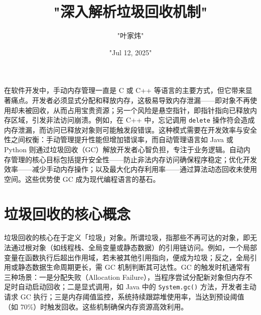 \title{"深入解析垃圾回收机制"}
\author{"叶家炜"}
\date{"Jul 12, 2025"}
\maketitle
在软件开发中，手动内存管理一直是 C 或 C++ 等语言的主要方式，但它带来显著痛点。开发者必须显式分配和释放内存，这极易导致内存泄漏——即对象不再使用却未被回收，从而占用宝贵资源；另一个风险是悬空指针，即指针指向已释放内存区域，引发非法访问崩溃。例如，在 C++ 中，忘记调用 \texttt{delete} 操作符会造成内存泄漏，而访问已释放对象则可能触发段错误。这种模式需要在开发效率与安全性之间权衡：手动管理提升性能但增加错误率，而自动管理语言如 Java 或 Python 则通过垃圾回收（GC）解放开发者心智负担，专注于业务逻辑。自动内存管理的核心目标包括提升安全性——防止非法内存访问确保程序稳定；优化开发效率——减少手动内存操作；以及最大化内存利用率——通过算法动态回收未使用空间。这些优势使 GC 成为现代编程语言的基石。\par
\chapter{垃圾回收的核心概念}
垃圾回收的核心在于定义「垃圾」对象。所谓垃圾，指那些不再可达的对象，即无法通过根对象（如线程栈、全局变量或静态数据）的引用链访问。例如，一个局部变量在函数执行后超出作用域，若未被其他引用指向，便成为垃圾；反之，全局引用或静态数据生命周期更长，需 GC 机制判断其可达性。GC 的触发时机通常有三种场景：一是分配失败（Allocation Failure），当程序尝试分配新对象但内存不足时自动启动回收；二是显式调用，如 Java 中的 \texttt{System.gc()} 方法，开发者主动请求 GC 执行；三是内存阈值监控，系统持续跟踪堆使用率，当达到预设阈值（如 70\%{}）时触发回收。这些机制确保内存资源高效利用。\par
